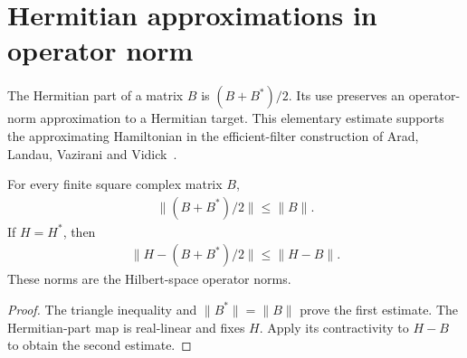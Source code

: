 \section{Hermitian approximations in operator norm}
\label{sec:hermitian_part_norm}

The Hermitian part of a matrix $B$ is $(B+B^*)/2$. Its use preserves an
operator-norm approximation to a Hermitian target. This elementary estimate
supports the approximating Hamiltonian in the efficient-filter construction
of Arad, Landau, Vazirani and Vidick~\cite[lines 1262--1268 and 1412--1420]{Arad2016RigorousRG}.

\begin{lemma}
    \label{lem:hermitian_part_norm}
    \leanok
    For every finite square complex matrix $B$,
    \begin{align}
        \|(B+B^*)/2\|\leq\|B\|.
    \end{align}
    If $H=H^*$, then
    \begin{align}
        \|H-(B+B^*)/2\|\leq\|H-B\|.
    \end{align}
    These norms are the Hilbert-space operator norms.
\end{lemma}
\begin{proof}\leanok
    The triangle inequality and $\|B^*\|=\|B\|$ prove the first estimate.
    The Hermitian-part map is real-linear and fixes $H$. Apply its
    contractivity to $H-B$ to obtain the second estimate.
\end{proof}
